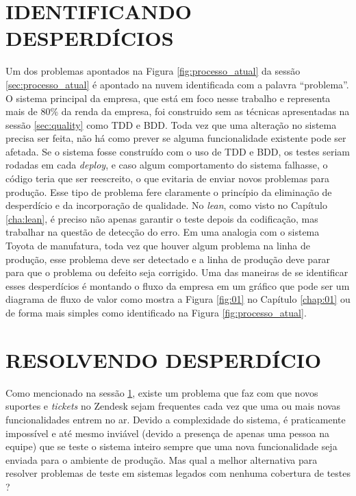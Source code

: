 \section{IDENTIFICANDO DESPERDÍCIOS}
\label{sec:identificando_despercio}

Um dos problemas apontados na Figura \ref{fig:processo_atual} da sessão \ref{sec:processo_atual} é apontado na nuvem identificada com a palavra ``problema''. O sistema principal da empresa, que está em foco nesse trabalho e representa mais de 80\% da renda da empresa, foi construido sem as técnicas apresentadas na sessão \ref{sec:quality} como TDD e BDD. Toda vez que uma alteração no sistema precisa ser feita, não há como prever se alguma funcionalidade existente pode ser afetada. Se o sistema fosse construído com o uso de TDD e BDD, os testes seriam rodadas em cada \textit{deploy}, e caso algum comportamento do sistema falhasse, o código teria que ser reescreito, o que evitaria de enviar novos problemas para produção. Esse tipo de problema fere claramente o princípio da eliminação de desperdício e da incorporação de qualidade. No \textit{lean}, como visto no Capítulo \ref{cha:lean}, é preciso não apenas garantir o teste depois da codificação, mas trabalhar na questão de detecção do erro. Em uma analogia com o sistema Toyota de manufatura, toda vez que houver algum problema na linha de produção, esse problema deve ser detectado e a linha de produção deve parar para que o problema ou defeito seja corrigido. Uma das maneiras de se identificar esses desperdícios é montando o fluxo da empresa em um gráfico que pode ser um diagrama de fluxo de valor como mostra a Figura \ref{fig:01} no Capítulo \ref{chap:01} ou de forma mais simples como identificado na Figura \ref{fig:processo_atual}.

\section{RESOLVENDO DESPERDÍCIO}

Como mencionado na sessão \ref{sec:identificando_despercio}, existe um problema que faz com que novos suportes e \textit{tickets} no Zendesk sejam frequentes cada vez que uma ou mais novas funcionalidades entrem no ar. Devido a complexidade do sistema, é praticamente impossível e até mesmo inviável (devido a presença de apenas uma pessoa na equipe) que se teste o sistema inteiro sempre que uma nova funcionalidade seja enviada para o ambiente de produção. Mas qual a melhor alternativa para resolver problemas de teste em sistemas legados com nenhuma cobertura de testes ? 

